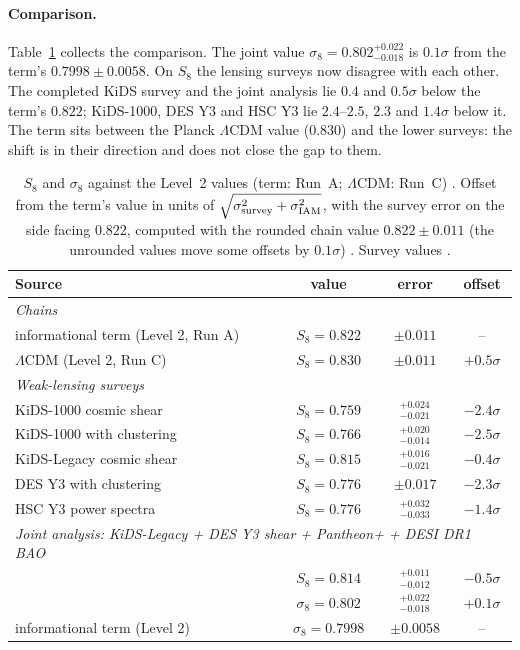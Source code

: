 \paragraph{Comparison.} Table~\ref{tab:st_s8} collects the comparison. The joint value $\sigma_8=0.802^{+0.022}_{-0.018}$ is $0.1\sigma$ from the
term's $0.7998\pm0.0058$. On $S_8$ the lensing surveys now disagree with each other. The completed KiDS survey and the joint analysis lie $0.4$ and
$0.5\sigma$ below the term's $0.822$; KiDS-1000, DES Y3 and HSC Y3 lie $2.4$--$2.5$, $2.3$ and $1.4\sigma$ below it. The term sits between the Planck
$\Lambda$CDM value ($0.830$) and the lower surveys: the shift is in their direction and does not close the gap to them. \calc
\begin{table}[htbp]\centering\small
\caption{$S_8$ and $\sigma_8$ against the Level~2 values (term: Run~A; $\Lambda$CDM: Run~C) \measured. Offset from the term's value in units of $\sqrt{\sigma^2_{\rm survey}+\sigma^2_{\rm IAM}}$, with the survey error on the side facing $0.822$, computed with the rounded chain value $0.822\pm0.011$ (the unrounded values move some offsets by $0.1\sigma$) \calc. Survey values \observed.}\label{tab:st_s8}
\begin{tabular}{lccc}\toprule
Source & value & error & offset\\\midrule
\multicolumn{4}{l}{\emph{Chains}}\\
informational term (Level 2, Run A) & $S_8=0.822$ & $\pm0.011$ & --\\
$\Lambda$CDM (Level 2, Run C) & $S_8=0.830$ & $\pm0.011$ & $+0.5\sigma$\\\midrule
\multicolumn{4}{l}{\emph{Weak-lensing surveys}}\\
KiDS-1000 cosmic shear~\cite{Asgari2021} & $S_8=0.759$ & $^{+0.024}_{-0.021}$ & $-2.4\sigma$\\
KiDS-1000 with clustering~\cite{Heymans2021} & $S_8=0.766$ & $^{+0.020}_{-0.014}$ & $-2.5\sigma$\\
KiDS-Legacy cosmic shear~\cite{Wright2025} & $S_8=0.815$ & $^{+0.016}_{-0.021}$ & $-0.4\sigma$\\
DES Y3 with clustering~\cite{DESY3} & $S_8=0.776$ & $\pm0.017$ & $-2.3\sigma$\\
HSC Y3 power spectra~\cite{HSCY3Dalal} & $S_8=0.776$ & $^{+0.032}_{-0.033}$ & $-1.4\sigma$\\\midrule
\multicolumn{4}{l}{\emph{Joint analysis: KiDS-Legacy + DES Y3 shear + Pantheon+ + DESI DR1 BAO}~\cite{Stolzner2025}}\\
& $S_8=0.814$ & $^{+0.011}_{-0.012}$ & $-0.5\sigma$\\
& $\sigma_8=0.802$ & $^{+0.022}_{-0.018}$ & $+0.1\sigma$\\
informational term (Level 2) & $\sigma_8=0.7998$ & $\pm0.0058$ & --\\\bottomrule
\end{tabular}\end{table}

